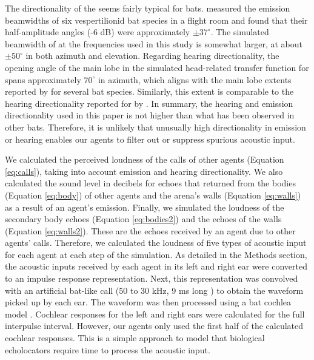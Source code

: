 \documentclass[a4paper, 11pt]{article}
\newcommand{\dg}{^\circ}
\begin{document}
The directionality of the  seems fairly typical for bats. \citet{Jakobsen2012} measured the emission beamwidths of six vespertilionid bat species in a flight room and found that their half-amplitude angles (-6 dB) were approximately $\pm 37\dg$. The simulated beamwidth of  at the frequencies used in this study is somewhat larger, at about $\pm 50\dg$ in both azimuth and elevation. Regarding hearing directionality, the opening angle of the main lobe in the simulated head-related transfer function for  spans approximately $70\dg$ in azimuth, which aligns with the main lobe extents reported by \citet{Obrist1993} for several bat species. Similarly, this extent is comparable to the hearing directionality reported for  by \citet{Aytekin2004}. In summary, the hearing and emission directionality used in this paper is not higher than what has been observed in other bats. Therefore, it is unlikely that unusually high directionality in emission or hearing enables our agents to filter out or suppress spurious acoustic input.

We calculated the perceived loudness of the calls of other agents (Equation \ref{eq:calls}), taking into account emission and hearing directionality. We also calculated the sound level in decibels for echoes that returned from the bodies (Equation \ref{eq:body}) of other agents \citep{Giuggioli2015} and the arena's walls (Equation \ref{eq:walls}) as a result of an agent's emission. Finally, we simulated the loudness of the secondary body echoes (Equation \ref{eq:bodies2}) and the echoes of the walls (Equation \ref{eq:walls2}). These are the echoes received by an agent due to other agents' calls. Therefore, we calculated the loudness of five types of acoustic input for each agent at each step of the simulation. As detailed in the Methods section, the acoustic inputs received by each agent in its left and right ear were converted to an impulse response representation. Next, this representation was convolved with an artificial bat-like call (50 to 30 kHz, 9 ms long \citep{Gillam2010}) to obtain the waveform picked up by each ear. The waveform was then processed using a bat cochlea model \citep{Wiegrebe2008}. Cochlear responses for the left and right ears were calculated for the full interpulse interval. However, our agents only used the first half of the calculated cochlear responses. This is a simple approach to model that biological echolocators require time to process the acoustic input.
\end{document}
